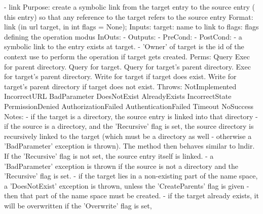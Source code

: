 \begin{myspec}
 
    - link
      Purpose:  create a symbolic link from the target entry to
                the source entry ( this entry) so that any reference 
                to the target refers to the source entry
      Format:   link               (in  url       target,
                                    in  int       flags = None);
      Inputs:   target:             name to link to
                flags:              flags defining the operation
                                    modus
      InOuts:   -
      Outputs:  -
      PreCond:  -
      PostCond: - a symbolic link to the entry exists at target.
                - 'Owner' of target is the id of the context
                  use to perform the operation if target gets
                  created.
      Perms:    Query 
                Exec  for parent directory.
                Query for target.
                Query for target's parent directory.
                Exec  for target's parent directory.
                Write for target
                      if  target does exist.
                Write for target's parent directory 
                      if  target does not exist.
      Throws:   NotImplemented
                IncorrectURL
                BadParameter
                DoesNotExist
                AlreadyExists
                IncorrectState
                PermissionDenied
                AuthorizationFailed
                AuthenticationFailed
                Timeout
                NoSuccess
      Notes:    - if the target is a directory, the source entry
                  is linked into that directory
                - if the source is a directory, and the
                  'Recursive' flag is set, the source directory
                  is recursively linked to the target (which must
                  be a directory as well - otherwise a
                  'BadParameter' exception is thrown).  The
                  method then behaves similar to lndir.  If the
                  'Recursive' flag is not set, the source entry
                  itself is linked.  
                - a 'BadParameter' exception is thrown if the 
                  source is not a directory and the 'Recursive' 
                  flag is set.
                - if the target lies in a non-existing part of
                  the name space, a 'DoesNotExist' exception is
                  thrown, unless the 'CreateParents' flag is
                  given - then that part of the name space must
                  be created.
                - if the target already exists, it will be
                  overwritten if the 'Overwrite' flag is set,

\end{myspec}
